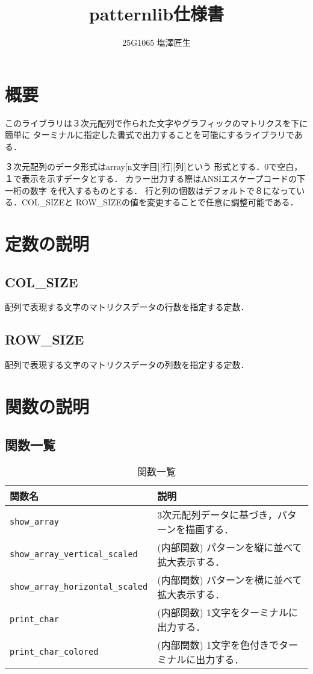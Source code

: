 \documentclass[uplatex]{jsarticle}
\begin{document}
\title{patternlib仕様書}
\author{25G1065 塩澤匠生}

\maketitle




\tableofcontents
\clearpage

\section{概要}

このライブラリは３次元配列で作られた文字やグラフィックのマトリクスを下に簡単に
ターミナルに指定した書式で出力することを可能にするライブラリである．

３次元配列のデータ形式はarray[n文字目][行][列]という
形式とする．0で空白，１で表示を示すデータとする．
カラー出力する際はANSIエスケープコードの下一桁の数字
を代入するものとする．
行と列の個数はデフォルトで８になっている．COL\_SIZEと
ROW\_SIZEの値を変更することで任意に調整可能である．

\section{定数の説明}
\subsection{COL\_SIZE}
配列で表現する文字のマトリクスデータの行数を指定する定数．
\subsection{ROW\_SIZE}
配列で表現する文字のマトリクスデータの列数を指定する定数．

\section{関数の説明}
\subsection{関数一覧}
\begin{table}[H]
    \centering
    \caption{関数一覧}
    \begin{tabular}{|l|p{9cm}|}
        \hline
        \textbf{関数名} & \textbf{説明} \\ \hline
        \texttt{show\_array} & 3次元配列データに基づき，パターンを描画する． \\ \hline
        \texttt{show\_array\_vertical\_scaled} & (内部関数) パターンを縦に並べて拡大表示する． \\ \hline
        \texttt{show\_array\_horizontal\_scaled} & (内部関数) パターンを横に並べて拡大表示する． \\ \hline
        \texttt{print\_char} & (内部関数) 1文字をターミナルに出力する． \\ \hline
        \texttt{print\_char\_colored} & (内部関数) 1文字を色付きでターミナルに出力する． \\ \hline
    \end{tabular}
\end{table}
\end{document}
